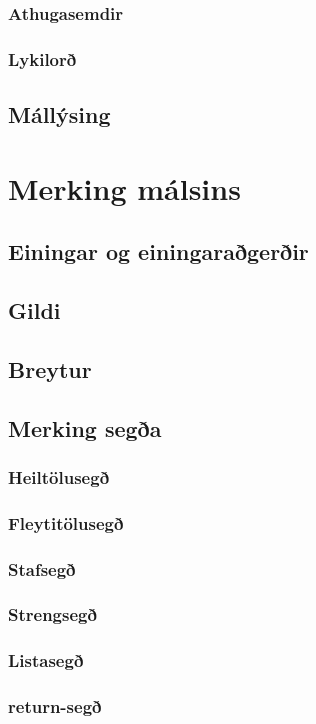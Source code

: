 \documentclass[12pt,a4paper]{article}
\begin{document}
\subsubsection{Athugasemdir}
\subsubsection{Lykilorð}
\subsection{Mállýsing}
\section{Merking málsins}
\subsection{Einingar og einingaraðgerðir}
\subsection{Gildi}
\subsection{Breytur}
\subsection{Merking segða}
\subsubsection{Heiltölusegð}
\subsubsection{Fleytitölusegð}
\subsubsection{Stafsegð}
\subsubsection{Strengsegð}
\subsubsection{Listasegð}
\subsubsection{return-segð}
\end{document}
